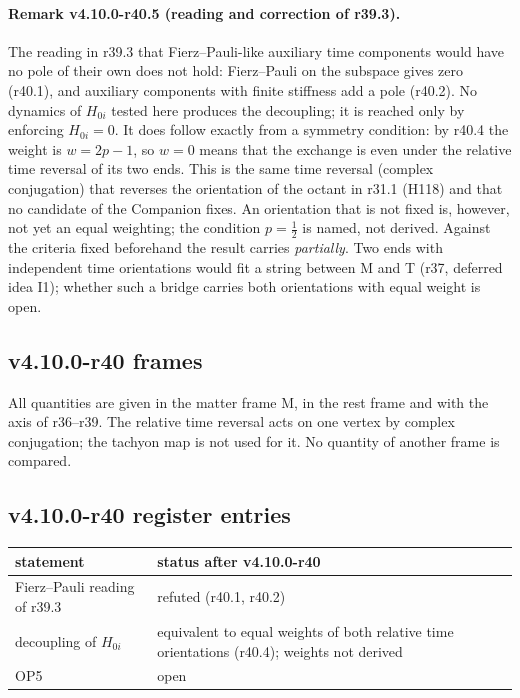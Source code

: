 \paragraph{Remark v4.10.0-r40.5 (reading and correction of r39.3).}
The reading in r39.3 that Fierz--Pauli-like auxiliary time components would have no pole of their own does not hold: Fierz--Pauli on the subspace
gives zero (r40.1), and auxiliary components with finite stiffness add a pole (r40.2).  No dynamics of \(H_{0i}\) tested here produces the decoupling;
it is reached only by enforcing \(H_{0i}=0\).  It does follow exactly from a symmetry condition: by r40.4 the weight is \(w=2p-1\), so \(w=0\) means that
the exchange is even under the relative time reversal of its two ends.  This is the same time reversal (complex conjugation) that reverses the
orientation of the octant in r31.1 (H118) and that no candidate of the Companion fixes.  An orientation that is not fixed is, however, not yet an
equal weighting; the condition \(p=\tfrac12\) is named, not derived.  Against the criteria fixed beforehand the result carries \emph{partially}.
Two ends with independent time orientations would fit a string between M and T (r37, deferred idea I1); whether such a bridge carries both
orientations with equal weight is open.

\subsection*{v4.10.0-r40 frames}
\label{subsec:v4100-r40-frames}

All quantities are given in the matter frame M, in the rest frame and with the axis of r36--r39.  The relative time reversal acts on one vertex by
complex conjugation; the tachyon map is not used for it.  No quantity of another frame is compared.

\subsection*{v4.10.0-r40 register entries}
\label{subsec:v4100-r40-register}

\begin{center}
\small
\begin{tabular}{@{}>{\raggedright\arraybackslash}p{}>{\raggedright\arraybackslash}p{}@{}}
\toprule
statement & status after v4.10.0-r40\\
\midrule
Fierz--Pauli reading of r39.3 & refuted (r40.1, r40.2)\\
decoupling of \(H_{0i}\) & equivalent to equal weights of both relative time orientations (r40.4); weights not derived\\
OP5 & open\\
\bottomrule
\end{tabular}
\end{center}

